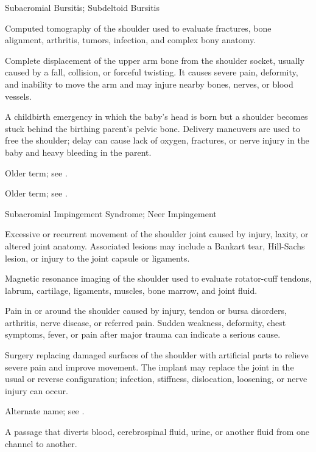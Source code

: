 \synonyms
Subacromial Bursitis; Subdeltoid Bursitis

 Computed tomography of the shoulder used to evaluate fractures, bone alignment, arthritis, tumors, infection, and complex bony anatomy.

 Complete displacement of the upper arm bone from the shoulder socket, usually caused by a fall, collision,
or forceful twisting. It causes severe pain, deformity, and inability to move the arm and may injure nearby bones, nerves, or blood vessels.

 A childbirth emergency in which the baby’s head is born but a shoulder becomes stuck behind the birthing parent’s pelvic bone. Delivery maneuvers are used to free the shoulder; delay can cause lack of oxygen, fractures, or nerve injury in the baby and heavy bleeding in the parent.

 Older term; see .

 Older term; see .

\synonyms
Subacromial Impingement Syndrome; Neer Impingement

 Excessive or recurrent movement of the shoulder joint caused by injury, laxity, or altered
joint anatomy. Associated lesions may include a Bankart tear, Hill-Sachs lesion, or injury to the joint capsule or
ligaments.

 Magnetic resonance imaging of the shoulder used to evaluate rotator-cuff tendons, labrum, cartilage, ligaments, muscles, bone marrow, and joint fluid.

 Pain in or around the shoulder caused by injury, tendon or bursa disorders, arthritis, nerve disease, or
referred pain. Sudden weakness, deformity, chest symptoms, fever, or pain after major trauma can indicate a serious cause.

 Surgery replacing damaged surfaces of the shoulder with artificial parts to relieve severe pain and improve movement. The implant may replace the joint in the usual or reverse configuration; infection, stiffness, dislocation, loosening, or nerve injury can occur.

 Alternate name; see .

 A passage that diverts blood, cerebrospinal fluid, urine, or another fluid from one channel to another.

